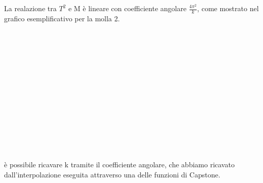\documentclass[a4paper]{article}
\theoremstyle{definition}
\begin{document}
	\noindent La realazione tra \(T^{2}\) e M è lineare con coefficiente angolare \(\frac{4 \pi^{2}}{k}\), come mostrato nel grafico esemplificativo per la molla 2.\\\\\\\\\\\\\\\\\\\\\\\\\\\\
	\begin{figure}[!htbp]
	\end{figure}

\noindent è possibile ricavare k tramite il coefficiente angolare, che abbiamo ricavato dall'interpolazione eseguita attraverso una delle funzioni di Capstone.\\
\end{document}

